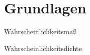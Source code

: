 \section*{Grundlagen}

\begin{bonus}{Wahrscheinlichkeitsmaß}

\end{bonus}

\begin{bonus}{Wahrscheinlichkeitsdichte}

\end{bonus}
